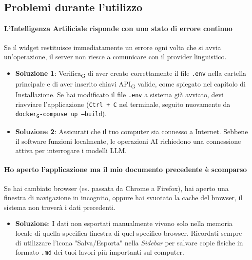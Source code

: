 \documentclass[11pt,a4paper]{article}
\newcommand{\gls}[1]{#1\textsubscript{G}}
\begin{document}
\subsection{Problemi durante l'utilizzo}

\paragraph{L'Intelligenza Artificiale risponde con uno stato di errore continuo}
Se il widget restituisce immediatamente un errore ogni volta che si avvia un'operazione, il server non riesce a comunicare con il provider linguistico.
\begin{itemize}
    \item \textbf{Soluzione 1}: \gls{Verifica} di aver creato correttamente il file \texttt{.env} nella cartella principale e di aver inserito chiavi \gls{API} valide, come spiegato nel capitolo di Installazione. Se hai modificato il file \texttt{.env} a sistema già avviato, devi riavviare l'applicazione (\texttt{Ctrl + C} nel terminale, seguito nuovamente da \texttt{\gls{docker}-compose up --build}).
    \item \textbf{Soluzione 2}: Assicurati che il tuo computer sia connesso a Internet. Sebbene il software funzioni localmente, le operazioni AI richiedono una connessione attiva per interrogare i modelli LLM.
\end{itemize}

\paragraph{Ho aperto l'applicazione ma il mio documento precedente è scomparso}
Se hai cambiato browser (es. passata da Chrome a Firefox), hai aperto una finestra di navigazione in incognito, oppure hai svuotato la cache del browser, il sistema non troverà i dati precedenti.
\begin{itemize}
    \item \textbf{Soluzione}: I dati non esportati manualmente vivono solo nella memoria locale di quella specifica finestra di quel specifico browser. Ricordati sempre di utilizzare l'icona "Salva/Esporta" nella \textit{Sidebar} per salvare copie fisiche in formato \texttt{.md} dei tuoi lavori più importanti sul computer.
\end{itemize}
\end{document}
